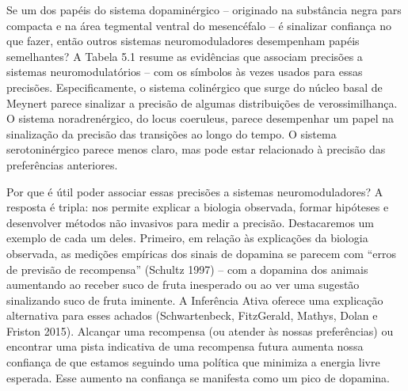 \documentclass[
  12pt,
]{book}
\begin{document}
Se um dos papéis do sistema dopaminérgico -- originado na substância negra pars compacta e na área tegmental ventral do mesencéfalo -- é sinalizar confiança no que fazer, então outros sistemas neuromoduladores desempenham papéis semelhantes? A Tabela 5.1 resume as evidências que associam precisões a sistemas neuromodulatórios -- com os símbolos às vezes usados para essas precisões. Especificamente, o sistema colinérgico que surge do núcleo basal de Meynert parece sinalizar a precisão de algumas distribuições de verossimilhança. O sistema noradrenérgico, do locus coeruleus, parece desempenhar um papel na sinalização da precisão das transições ao longo do tempo. O sistema serotoninérgico parece menos claro, mas pode estar relacionado à precisão das preferências anteriores.

Por que é útil poder associar essas precisões a sistemas neuromoduladores? A resposta é tripla: nos permite explicar a biologia observada, formar hipóteses e desenvolver métodos não invasivos para medir a precisão. Destacaremos um exemplo de cada um deles. Primeiro, em relação às explicações da biologia observada, as medições empíricas dos sinais de dopamina se parecem com ``erros de previsão de recompensa'' (Schultz 1997) -- com a dopamina dos animais aumentando ao receber suco de fruta inesperado ou ao ver uma sugestão sinalizando suco de fruta iminente. A Inferência Ativa oferece uma explicação alternativa para esses achados (Schwartenbeck, FitzGerald, Mathys, Dolan e Friston 2015). Alcançar uma recompensa (ou atender às nossas preferências) ou encontrar uma pista indicativa de uma recompensa futura aumenta nossa confiança de que estamos seguindo uma política que minimiza a energia livre esperada. Esse aumento na confiança se manifesta como um pico de dopamina.
\end{document}
